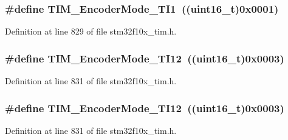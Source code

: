 \subsubsection[{\texorpdfstring{T\+I\+M\+\_\+\+Encoder\+Mode\+\_\+\+T\+I1}{TIM_EncoderMode_TI1}}]{\setlength{\rightskip}{0pt plus 5cm}\#define T\+I\+M\+\_\+\+Encoder\+Mode\+\_\+\+T\+I1~(({\bf uint16\+\_\+t})0x0001)}\hypertarget{group___t_i_m___encoder___mode_gabc63e3617a938382f87439ec58768b8e}{}\label{group___t_i_m___encoder___mode_gabc63e3617a938382f87439ec58768b8e}


Definition at line 829 of file stm32f10x\+\_\+tim.\+h.

\subsubsection[{\texorpdfstring{T\+I\+M\+\_\+\+Encoder\+Mode\+\_\+\+T\+I12}{TIM_EncoderMode_TI12}}]{\setlength{\rightskip}{0pt plus 5cm}\#define T\+I\+M\+\_\+\+Encoder\+Mode\+\_\+\+T\+I12~(({\bf uint16\+\_\+t})0x0003)}\hypertarget{group___t_i_m___encoder___mode_ga12511f903de08f1a634ff7828757f081}{}\label{group___t_i_m___encoder___mode_ga12511f903de08f1a634ff7828757f081}


Definition at line 831 of file stm32f10x\+\_\+tim.\+h.

\subsubsection[{\texorpdfstring{T\+I\+M\+\_\+\+Encoder\+Mode\+\_\+\+T\+I12}{TIM_EncoderMode_TI12}}]{\setlength{\rightskip}{0pt plus 5cm}\#define T\+I\+M\+\_\+\+Encoder\+Mode\+\_\+\+T\+I12~(({\bf uint16\+\_\+t})0x0003)}\hypertarget{group___t_i_m___encoder___mode_ga12511f903de08f1a634ff7828757f081}{}\label{group___t_i_m___encoder___mode_ga12511f903de08f1a634ff7828757f081}


Definition at line 831 of file stm32f10x\+\_\+tim.\+h.

